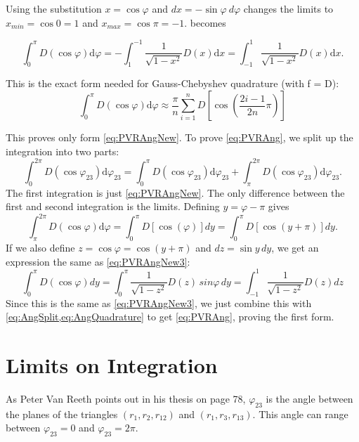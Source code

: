 \documentclass[Dissertation.tex]{subfiles}
\begin{document}
Using the substitution $x = \cos \varphi$ and $dx = -\sin \varphi \:d\varphi$ changes the limits to $x_{min} \!\!=\! \cos 0 \! =\! 1$ and $x_{max} = \cos \pi = -1$.  becomes

\begin{equation}
\int_0^\pi  D\left( {\cos \varphi } \right){\textrm{d}}\varphi = - \int_1^{ - 1} \frac{1}{{\sqrt {1 - {x^2}} }}D\left( x \right){\textrm{d}}x = \int_{ - 1}^1 \frac{1}{{\sqrt {1 - {x^2}} }}D\left( x \right){\textrm{d}}x.
\label{eq:PVRAngNew3}
\end{equation}

This is the exact form needed for Gauss-Chebyshev quadrature (with f = D):
\begin{equation}
\int_0^\pi  D\left( {\cos \varphi } \right){\textrm{d}}\varphi \approx \frac{\pi }{n} \sum_{i = 1}^n D\!\left[ {\cos \left( {\frac{{2i - 1}}{{2n}}\pi } \right)} \right]
\label{eq:AngQuadrature}
\end{equation}

This proves only form \cref{eq:PVRAngNew}. To prove \cref{eq:PVRAng}, we split up the integration into two parts:
\begin{equation}
\int_0^{2\pi } D\left( {\cos {\varphi_{23}}} \right){\textrm{d}}{\varphi_{23}} = \int_0^\pi  D\left( {\cos {\varphi_{23}}} \right){\textrm{d}}{\varphi_{23}} + \int _\pi ^{2\pi } D\left( {\cos {\varphi _{23}}} \right){\textrm{d}}{\varphi _{23}}.
\label{eq:AngSplit}
\end{equation}
The first integration is just \cref{eq:PVRAngNew}. The only difference between the first and second integration is the limits. Defining $y = \varphi - \pi$ gives
\begin{equation}
\int _\pi ^{2\pi } D\left( {\cos {\varphi}} \right){\textrm{d}}{\varphi} = \int_0^\pi D\left[\cos(\varphi)\right] dy = \int_0^\pi D\left[\cos(y+\pi)\right] dy.
\end{equation}
If we also define $z = \cos \varphi = \cos(y+\pi)$ and $dz = \sin y \,dy$, we get an expression the same as \cref{eq:PVRAngNew3}:
\begin{equation}
\int_0^\pi D\left(\cos\varphi\right) dy = \int_0^\pi \frac{1}{\sqrt{1-z^2}} D(z)\, sin\varphi\, dy = \int_{-1}^1 \frac{1}{\sqrt{1-z^2}} D(z) dz
\end{equation}
Since this is the same as \cref{eq:PVRAngNew3}, we just combine this with \cref{eq:AngSplit,eq:AngQuadrature} to get \cref{eq:PVRAng}, proving the first form.


\section{Limits on Integration}
As Peter Van Reeth points out in his thesis on page 78, $\varphi_{23}$ is the angle between the planes of the triangles $(r_1,r_2,r_{12})$ and $(r_1,r_3,r_{13})$. This angle can range between $\varphi_{23} = 0$ and $\varphi_{23} = 2 \pi$.
\end{document}
